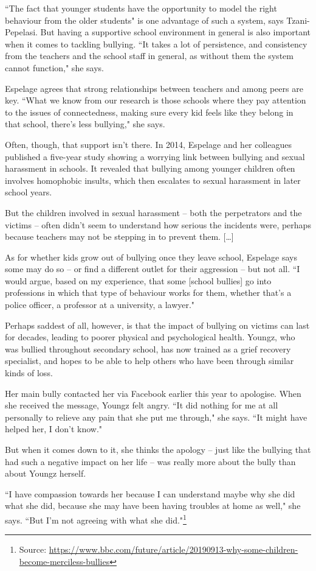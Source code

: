 \documentclass[10pt,a4paper]{article}
\newcommand{\qm}[1]{``#1"}
\newcommand{\source}[1]{\footnote{Source: \href{#1}{#1}}}
\begin{document}
\qm{The fact that younger students have the opportunity to model the right behaviour from the older students} is one advantage of such a system, says Tzani-Pepelasi. But having a supportive school environment in general is also important when it comes to tackling bullying. \qm{It takes a lot of persistence, and consistency from the teachers and the school staff in general, as without them the system cannot function,} she says.

Espelage agrees that strong relationships between teachers and among peers are key. \qm{What we know from our research is those schools where they pay attention to the issues of connectedness, making sure every kid feels like they belong in that school, there's less bullying,} she says.

Often, though, that support isn't there. In 2014, Espelage and her colleagues published a five-year study showing a worrying link between bullying and sexual harassment in schools. It revealed that bullying among younger children often involves homophobic insults, which then escalates to sexual harassment in later school years.

But the children involved in sexual harassment -- both the perpetrators and the victims -- often didn't seem to understand how serious the incidents were, perhaps because teachers may not be stepping in to prevent them. [\ldots]

As for whether kids grow out of bullying once they leave school, Espelage says some may do so -- or find a different outlet for their aggression -- but not all. \qm{I would argue, based on my experience, that some [school bullies] go into professions in which that type of behaviour works for them, whether that's a police officer, a professor at a university, a lawyer.}

Perhaps saddest of all, however, is that the impact of bullying on victims can last for decades, leading to poorer physical and psychological health. Youngz, who was bullied throughout secondary school, has now trained as a grief recovery specialist, and hopes to be able to help others who have been through similar kinds of loss.

Her main bully contacted her via Facebook earlier this year to apologise. When she received the message, Youngz felt angry. \qm{It did nothing for me at all personally to relieve any pain that she put me through,} she says. \qm{It might have helped her, I don't know.}

But when it comes down to it, she thinks the apology -- just like the bullying that had such a negative impact on her life -- was really more about the bully than about Youngz herself.

\qm{I have compassion towards her because I can understand maybe why she did what she did, because she may have been having troubles at home as well,} she says. \qm{But I'm not agreeing with what she did.}\source{https://www.bbc.com/future/article/20190913-why-some-children-become-merciless-bullies}
\end{document}
